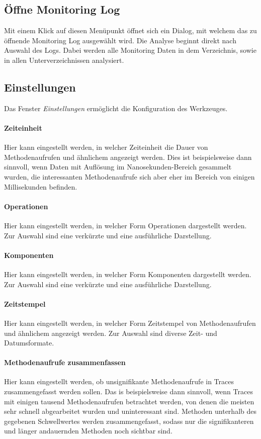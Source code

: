 \documentclass{article}
\begin{document}
  \subsection{Öffne Monitoring Log}
  Mit einem Klick auf diesen Menüpunkt öffnet sich ein Dialog, mit welchem das zu öffnende Monitoring Log ausgewählt wird.
  Die Analyse beginnt direkt nach Auswahl des Logs.
  Dabei werden alle Monitoring Daten in dem Verzeichnis, sowie in allen Unterverzeichnissen analysiert.

  \subsection{Einstellungen}
  Das Fenster \textit{Einstellungen} ermöglicht die Konfiguration des Werkzeuges.

  \paragraph{Zeiteinheit}
  Hier kann eingestellt werden, in welcher Zeiteinheit die Dauer von Methodenaufrufen und ähnlichem angezeigt werden.
  Dies ist beispielsweise dann sinnvoll, wenn Daten mit Auflösung im Nanosekunden-Bereich gesammelt wurden, die interessanten Methodenaufrufe sich aber eher im Bereich von einigen Millisekunden befinden.

  \paragraph{Operationen}
  Hier kann eingestellt werden, in welcher Form Operationen dargestellt werden.
  Zur Auswahl sind eine verkürzte und eine ausführliche Darstellung.

  \paragraph{Komponenten}
  Hier kann eingestellt werden, in welcher Form Komponenten dargestellt werden.
  Zur Auswahl sind eine verkürzte und eine ausführliche Darstellung.

  \paragraph{Zeitstempel}
  Hier kann eingestellt werden, in welcher Form Zeitstempel von Methodenaufrufen und ähnlichem angezeigt werden.
  Zur Auswahl sind diverse Zeit- und Datumsformate.

  \paragraph{Methodenaufrufe zusammenfassen}
  Hier kann eingestellt werden, ob unsignifikante Methodenaufrufe in Traces zusammengefasst werden sollen.
  Das is beispielsweise dann sinnvoll, wenn Traces mit einigen tausend Methodenaufrufen betrachtet werden, von denen die meisten sehr schnell abgearbeitet wurden und uninteressant sind.  
  Methoden unterhalb des gegebenen Schwellwertes werden zusammengefasst, sodass nur die signifikanteren und länger andauernden Methoden noch sichtbar sind.
\end{document}

